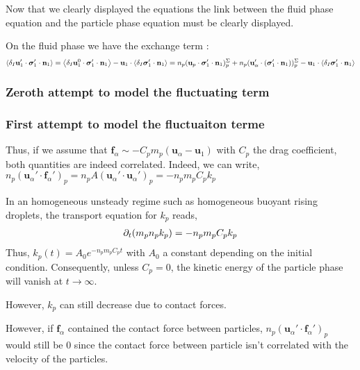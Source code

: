 Now that we clearly displayed the equations the link between the fluid phase equation and the particle phase equation must be clearly displayed. 

On the fluid phase we have the exchange term : 
\begin{equation}
    \left<\delta_I \textbf{u}_1' \cdot \bm{\sigma}_1' \cdot \textbf{n}_1\right>
    = 
    \left<\delta_I \textbf{u}_1^0 \cdot \bm{\sigma}_1' \cdot \textbf{n}_1\right>
    - \textbf{u}_1 \cdot \left<\delta_I  \bm{\sigma}_1' \cdot \textbf{n}_1\right>
    = n_p( \textbf{u}_p \cdot \bm{\sigma}_1' \cdot \textbf{n}_1)^\Sigma_p
    + n_p( \textbf{u}_\alpha' \cdot (\bm{\sigma}_1' \cdot \textbf{n}_1))^\Sigma_p
    - \textbf{u}_1 \cdot \left<\delta_I  \bm{\sigma}_1' \cdot \textbf{n}_1\right>
\end{equation}
\subsubsection*{Zeroth attempt to model the fluctuating term}



\subsubsection*{First attempt to model the fluctuaiton terme}
Thus, if we assume that $\textbf{f}_\alpha \sim - C_p m_p  (\textbf{u}_\alpha - \textbf{u}_1)$ with $C_p $ the drag coefficient, both quantities are indeed correlated.
Indeed, we can write, $n_p (\textbf{u}_\alpha' \cdot \textbf{f}_\alpha' )_p = n_p A (\textbf{u}_\alpha' \cdot \textbf{u}_\alpha' )_p = - n_p m_p C_p k_p $

In an homogeneous unsteady regime such as homogeneous buoyant rising droplets, the transport equation for $k_p$ reads, 
\begin{multline*}
    \partial_t(m_p n_pk_p)
    = 
    - n_p m_p C_p k_p
    \\
\end{multline*}
Thus, $k_p(t) = A_0 e^{- n_p m_p C_p t}$ with $A_0$ a constant depending on the initial condition. 
Consequently, unless $C_p = 0$, the kinetic energy of the particle phase will vanish at $t \rightarrow \infty$.  

However, $k_p$ can still decrease due to contact forces. 

However, if $\textbf{f}_\alpha$ contained the contact force between particles, $n_p (\textbf{u}_\alpha' \cdot \textbf{f}_\alpha')_p$ would still be $0$ since the contact force between particle isn't correlated with the velocity of the particles. 

